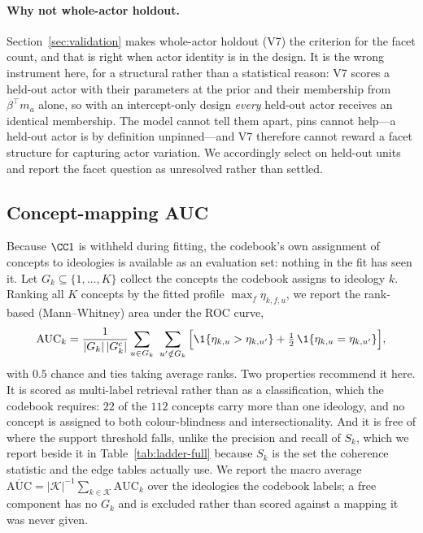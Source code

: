 \paragraph{Why not whole-actor holdout.} Section~\ref{sec:validation} makes whole-actor
holdout (V7) the criterion for the facet count, and that is right when actor identity is
in the design. It is the wrong instrument here, for a structural rather than a
statistical reason: V7 scores a held-out actor with their parameters at the prior and
their membership from $\beta^\top m_a$ alone, so with an intercept-only design
\emph{every} held-out actor receives an identical membership. The model cannot tell them
apart, pins cannot help---a held-out actor is by definition unpinned---and V7 therefore
cannot reward a facet structure for capturing actor variation. We accordingly select on
held-out units and report the facet question as unresolved rather than settled.

\subsection{Concept-mapping AUC}\label{app:auc}

Because $\CC1$ is withheld during fitting, the codebook's own assignment of concepts to
ideologies is available as an evaluation set: nothing in the fit has seen it. Let
$G_k\subseteq\{1,\dots,K\}$ collect the concepts the codebook assigns to ideology $k$.
Ranking all $K$ concepts by the fitted profile $\max_f\eta_{k,f,u}$, we report the
rank-based (Mann--Whitney) area under the ROC curve,
\[
  \mathrm{AUC}_k=\frac{1}{|G_k|\,|G_k^{c}|}
  \sum_{u\in G_k}\ \sum_{u'\notin G_k}
  \Big[\1\{\eta_{k,u}>\eta_{k,u'}\}+\tfrac12\,\1\{\eta_{k,u}=\eta_{k,u'}\}\Big],
\]
with $0.5$ chance and ties taking average ranks. Two properties recommend it here. It is
scored as multi-label retrieval rather than as a classification, which the codebook
requires: $22$ of the $112$ concepts carry more than one ideology, and no concept is
assigned to both colour-blindness and intersectionality. And it is free of where the
support threshold falls, unlike the precision and recall of $S_k$, which we report beside
it in Table~\ref{tab:ladder-full} because $S_k$ is the set the coherence statistic and
the edge tables actually use. We report the macro average
$\overline{\mathrm{AUC}}=|\mathcal{K}|^{-1}\sum_{k\in\mathcal{K}}\mathrm{AUC}_k$ over the
ideologies the codebook labels; a free component has no $G_k$ and is excluded rather than
scored against a mapping it was never given.

